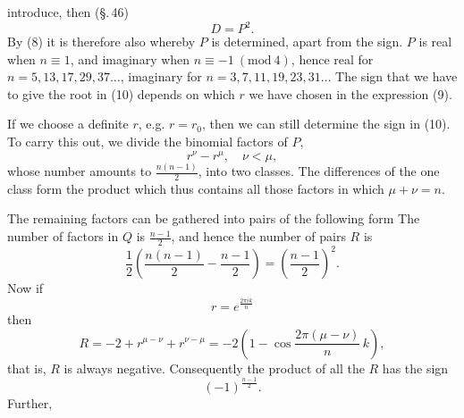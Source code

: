 
introduce, then (\S.\,46)
\[
D = P^2.
\]
By (8) it is therefore also
whereby $P$ is determined, apart from the sign. $P$ is real when $n \equiv 1$, and imaginary when $n \equiv -1 \ (\mathrm{mod}\ 4)$, hence real for $n = 5, 13, 17, 29, 37 \ldots$, imaginary for $n = 3, 7, 11, 19, 23, 31 \ldots$ The sign that we have to give the root in (10) depends on which $r$ we have chosen in the expression (9).

If we choose a definite $r$, e.g. $r = r_0$, then we can still determine the sign in (10). To carry this out, we divide the binomial factors of $P$,
\[
r^\nu - r^\mu, \quad \nu < \mu,
\]
whose number amounts to $\frac{n(n-1)}{2}$, into two classes. The differences of the one class form the product
which thus contains all those factors in which $\mu + \nu = n$.

The remaining factors can be gathered into pairs of the following form
The number of factors in $Q$ is $\frac{n-1}{2}$, and hence the number of pairs $R$ is
\[
\frac{1}{2}\left(\frac{n(n-1)}{2} - \frac{n-1}{2}\right) = \left(\frac{n-1}{2}\right)^2.
\]
Now if
\[
r = e^{\frac{2\pi i k}{n}}
\]
then
\[
R = -2 + r^{\mu-\nu} + r^{\nu-\mu} = -2\left(1 - \cos\frac{2\pi(\mu-\nu)}{n}\,k\right),
\]
that is, $R$ is always negative. Consequently the product of all the $R$ has the sign
\[
(-1)^{\frac{n-1}{2}}.
\]
Further,
